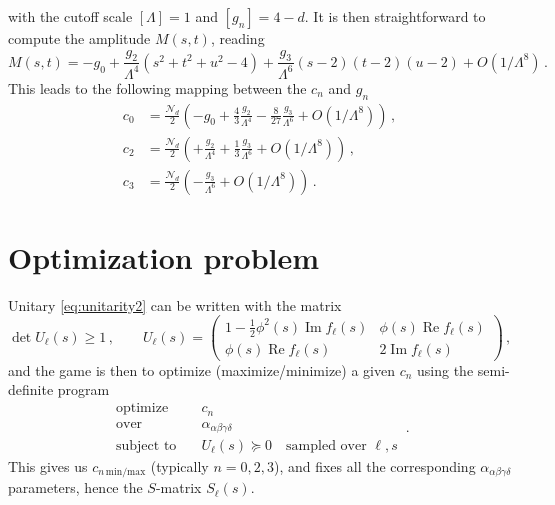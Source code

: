 with the cutoff scale $[\Lambda]=1$ and $[g_n]=4-d$. It is then straightforward to compute the amplitude $M(s,t)$, reading
\begin{equation}
M(s,t)=-g_0
+\frac{g_2}{\Lambda^4}\left(s^2+t^2+u^2-4\right)
+\frac{g_3}{\Lambda^6}(s-2)(t-2)(u-2)
+O\left(1/\Lambda^8\right)\,.
\end{equation}
This leads to the following mapping between the $c_n$ and $g_n$
\begin{equation}
\begin{aligned}
c_0 & = \frac{\mathcal{N}_d}{2}\left(-g_0+\frac{4}{3}\frac{g_2}{\Lambda^4}-\frac{8}{27}\frac{g_3}{\Lambda^6}+O\left(1/\Lambda^8\right)\right)\,, \\
c_2 & = \frac{\mathcal{N}_d}{2}\left(+\frac{g_2}{\Lambda^4}+\frac{1}{3}\frac{g_3}{\Lambda^6}+O\left(1/\Lambda^8\right)\right) \,, \\
c_3 & = \frac{\mathcal{N}_d}{2}\left(-\frac{g_3}{\Lambda^6}+O\left(1/\Lambda^8\right)\right) \,.
\end{aligned}
\end{equation}



\section*{Optimization problem}
Unitary \eqref{eq:unitarity2} can be written with the matrix
\begin{equation}
\det U_\ell(s)\geq1\,, \qquad
U_\ell(s)=\begin{pmatrix}
1-\frac{1}{2}\phi^2(s)\operatorname{Im} f_\ell(s) &
\phi(s)\operatorname{Re}f_\ell(s)  \\
\phi(s)\operatorname{Re}f_\ell(s) &
2\operatorname{Im}f_\ell(s)
\end{pmatrix}\,,
\end{equation}
and the game is then to optimize (maximize/minimize) a given $c_n$ using the semi-definite program 
\begin{equation}
\begin{aligned}
\text{optimize} \quad & c_n \\
\text{over} \quad & \alpha_{\alpha\beta\gamma\delta} \\
\text{subject to} \quad & U_\ell(s)\succeq 0 \quad \text{sampled over }\ell, s
\end{aligned}\,.
\end{equation}
This gives us $c_{n\,\mathrm{min/max}}$ (typically $n=0,2,3$), and fixes all the corresponding $\alpha_{\alpha\beta\gamma\delta}$ parameters, hence the $S$-matrix $S_\ell(s)$.




